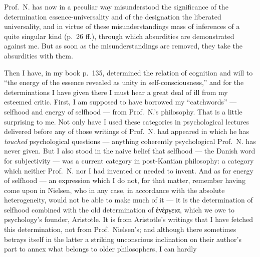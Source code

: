 \documentclass[12pt,a4paper]{book}
\begin{document}
Prof.\ N. has now in a peculiar way misunderstood the significance of the
determination essence-universality and of the designation the liberated
universality, and in virtue of these misunderstandings
mass of inferences of a quite singular kind (p.\ 26 ff.), through which
absurdities are demonstrated against me. But as soon as the misunderstandings
are removed, they take the absurdities with them.

Then I have, in my book p.\ 135, determined the relation of cognition and will
to ``the energy of the essence revealed as unity in self-consciousness,'' and
for the determinations I have given there I must hear a great deal of ill from
my esteemed critic. First, I am supposed to have borrowed my ``catchwords'' ---
selfhood and energy of selfhood --- from Prof.\ N.'s philosophy. That is a
little surprising to me. Not only have I used these categories in psychological
lectures delivered before any of those writings of Prof.\ N. had appeared in
which he has \emph{touched} psychological questions --- anything coherently
psychological Prof.\ N. has never given. But I also stood in the naive belief
that selfhood --- the Danish word for subjectivity --- was a current category in
post-Kantian philosophy: a
category which neither Prof.\ N. nor I had invented or needed to invent. And as
for energy of selfhood --- an expression which I do not, for that matter,
remember having come upon in Nielsen, who in any case, in accordance with the
absolute heterogeneity, would not be able to make much
of it --- it is the determination of selfhood combined with the old determination
of ἐνέργεια, which we owe to psychology's founder, Aristotle. It is from
Aristotle's
writings that I have fetched this determination, not from Prof.\ Nielsen's; and
although there sometimes betrays itself in the latter a striking unconscious
inclination on their author's part to annex what belongs to older philosophers,
I can hardly
\end{document}
